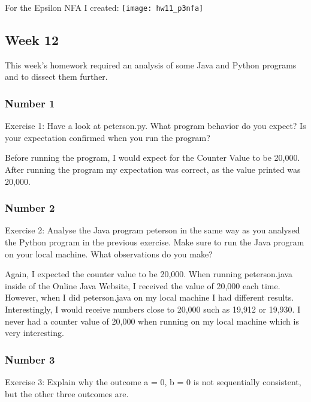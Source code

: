 \documentclass{article}
\theoremstyle{theorem}
\theoremstyle{definition}
\theoremstyle{remark}
\begin{document}
\noindent\newline\newline For the Epsilon NFA I created:\newline
\texttt{[image: hw11\_p3nfa]}


\subsection{Week 12}
\noindent\newline This week's homework required an analysis of some Java and Python programs and to dissect them further.

\subsubsection{Number 1}
\noindent\newline Exercise 1: Have a look at peterson.py. What program behavior do you expect? Is your expectation confirmed when you run the program? 

\noindent\newline\newline Before running the program, I would expect for the Counter Value to be 20,000. After running the program my expectation was correct, as the value printed was 20,000.


\subsubsection{Number 2}
\noindent\newline Exercise 2: Analyse the Java program peterson in the same way as you analysed the Python program in the previous exercise. Make sure to run the Java program on your local machine. What observations do you make? 

\noindent\newline\newline Again, I expected the counter value to be 20,000. When running peterson.java inside of the Online Java Website, I received the value of 20,000 each time. However, when I did peterson.java on my local machine I had different results. Interestingly, I would receive numbers close to 20,000 such as 19,912 or 19,930. I never had a counter value of 20,000 when running on my local machine which is very interesting.


\subsubsection{Number 3}
\noindent\newline Exercise 3: Explain why the outcome a = 0, b = 0 is not sequentially consistent, but the other three outcomes are.
\end{document}
